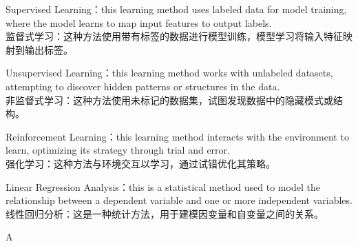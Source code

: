 \documentclass{article}
\begin{document}
\begin{choices}
    \item Supervised Learning：this learning method uses labeled data for model training, where the model learns to map input features to output labels.\\
    监督式学习：这种方法使用带有标签的数据进行模型训练，模型学习将输入特征映射到输出标签。

    \item Unsupervised Learning：this learning method works with unlabeled datasets, attempting to discover hidden patterns or structures in the data.\\
    非监督式学习：这种方法使用未标记的数据集，试图发现数据中的隐藏模式或结构。

    \item Reinforcement Learning：this learning method interacts with the environment to learn, optimizing its strategy through trial and error.\\
    强化学习：这种方法与环境交互以学习，通过试错优化其策略。

    \item Linear Regression Analysis：this is a statistical method used to model the relationship between a dependent variable and one or more independent variables.\\
    线性回归分析：这是一种统计方法，用于建模因变量和自变量之间的关系。
\end{choices}

\begin{correctanswer}
A
\end{correctanswer}
\end{document}
